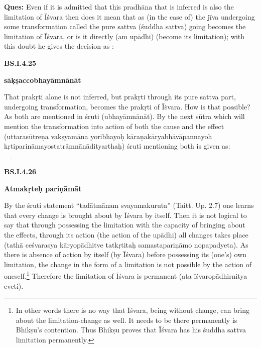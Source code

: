 \textbf{Ques:} Even if it is admitted that this pradhāna that is inferred is also the limitation of Īśvara then does it mean that as (in the case of) the jīva undergoing some transformation called the pure sattva (śuddha sattva) going becomes the limitation of Īśvara, or is it directly (am upādhi) (become its limitation); with this doubt he gives the decision as : 

\textbf{}



\textbf{BS.I.4.25}

\textbf{sāḳṣaccobhayāmnānāt}

That prakṛti alone is not inferred, but prakṛti through its pure sattva part, undergoing transformation, becomes the prakṛti of Īṡvara. How is that possible? As both are mentioned in śruti (ubhayāmnānāt). By the next sūtra which will mention the transformation into action of both the cause and the effect (uttarasūtreṇa vakṣyamāna yoribhayoḥ kāraṇakāryabhāvāpannayoh kṛtiparināmayostatrāmnānādityarthaḥ) śruti mentioning both is given as:

\textbf{}


 $\underline{\qquad}$

\textbf{BS.I.4.26}

\textbf{Ātmakṛteḥ pariṇāmāt}

By the śruti statement “tadātmānam svayamakuruta” (Taitt. Up. 2.7) one learns that every change is brought about by Īśvara by itself. Then it is not logical to say that through possessing the limitation with the capacity of bringing about the effects, through its action (the action of the upādhi) all changes takes place (tathā ceśvarasya kāryopādhitve tatkṛtitaḥ samastapariṇāmo nopapadyeta). As there is absence of action by itself (by Īśvara) before possessing its (one’s) own limitation, the change in the form of a limitation is not possible by the action of oneself.\footnote{In other words there is no way that Īśvara, being without change, can bring about the limitation-change  as well. It needs to be there permanently is Bhikṣu’s contention. Thus Bhikṣu proves that Īśvara has his śuddha sattva limitation permanently.} Therefore the limitation of Īśvara is permanent (ata īśvaropādhirnitya eveti).


